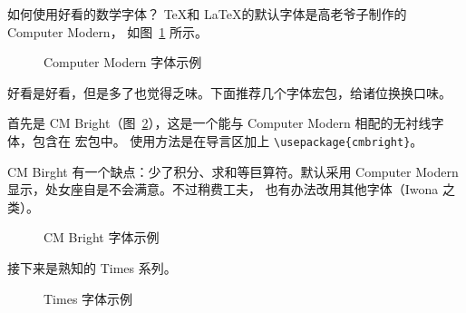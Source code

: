 \begin{myQA}{如何使用好看的数学字体？}
	\TeX 和 \LaTeX 的默认字体是高老爷子制作的 Computer Modern，
	如图~\ref{Fig:cm_1} 所示。
	
	\begin{figure}[h]
		\centering
		\caption{Computer Modern 字体示例}
		\label{Fig:cm_1}
	\end{figure}
	
	好看是好看，但是多了也觉得乏味。下面推荐几个字体宏包，给诸位换换口味。
	
	首先是 CM Bright（图~\ref{Fig:cmbright}），这是一个能与
	Computer Modern 相配的无衬线字体，包含在  宏包中。
	使用方法是在导言区加上 \verb|\usepackage{cmbright}|。
	
	CM Birght 有一个缺点：少了积分、求和等巨算符。默认采用
	Computer Modern 显示，处女座自是不会满意。不过稍费工夫，
	也有办法改用其他字体（Iwona 之类）。
	
	\begin{figure}[h]
		\centering
		\caption{CM Bright 字体示例}
		\label{Fig:cmbright}
	\end{figure}
	
	接下来是熟知的 Times 系列。
	
	\begin{figure}[h]
		\centering
		\caption{Times 字体示例}
		\label{Fig:txfonts}
	\end{figure}
	

\end{myQA}

